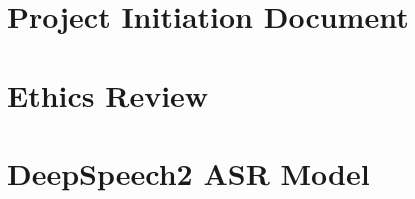 \appendix


\chapter{Project Initiation Document}




\chapter{Ethics Review}



\chapter{DeepSpeech2 ASR Model}


